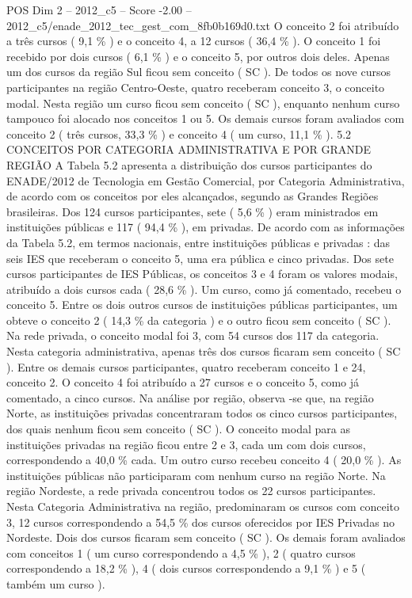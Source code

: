\begin{textsample}{POS Dim 2 – 2012\_c5 – Score -2.00 – 2012\_c5/enade\_2012\_tec\_gest\_com\_8fb0b169d0.txt}
O conceito 2 foi atribuído a três cursos ( 9,1 \% ) e o conceito 4, a 12 cursos ( 36,4 \% ).
O conceito 1 foi recebido por dois cursos ( 6,1 \% ) e o conceito 5, por outros dois deles.
Apenas um dos cursos da região Sul ficou sem conceito ( SC ).
De todos os nove cursos participantes na região Centro-Oeste, quatro receberam conceito 3, o conceito modal.
Nesta região um curso ficou sem conceito ( SC ), enquanto nenhum curso tampouco foi alocado nos conceitos 1 ou 5.
Os demais cursos foram avaliados com conceito 2 ( três cursos, 33,3 \% ) e conceito 4 ( um curso, 11,1 \% ). 5.2 CONCEITOS POR CATEGORIA ADMINISTRATIVA E POR GRANDE REGIÃO A Tabela 5.2 apresenta a distribuição dos cursos participantes do ENADE/2012 de Tecnologia em Gestão Comercial, por Categoria Administrativa, de acordo com os conceitos por eles alcançados, segundo as Grandes Regiões brasileiras.
Dos 124 cursos participantes, sete ( 5,6 \% ) eram ministrados em instituições públicas e 117 ( 94,4 \% ), em privadas.
De acordo com as informações da Tabela 5.2, em termos nacionais, entre instituições públicas e privadas : das seis IES que receberam o conceito 5, uma era pública e cinco privadas.
Dos sete cursos participantes de IES Públicas, os conceitos 3 e 4 foram os valores modais, atribuído a dois cursos cada ( 28,6 \% ).
Um curso, como já comentado, recebeu o conceito 5.
Entre os dois outros cursos de instituições públicas participantes, um obteve o conceito 2 ( 14,3 \% da categoria ) e o outro ficou sem conceito ( SC ).
Na rede privada, o conceito modal foi 3, com 54 cursos dos 117 da categoria.
Nesta categoria administrativa, apenas três dos cursos ficaram sem conceito ( SC ).
Entre os demais cursos participantes, quatro receberam conceito 1 e 24, conceito 2.
O conceito 4 foi atribuído a 27 cursos e o conceito 5, como já comentado, a cinco cursos.
Na análise por região, observa -se que, na região Norte, as instituições privadas concentraram todos os cinco cursos participantes, dos quais nenhum ficou sem conceito ( SC ).
O conceito modal para as instituições privadas na região ficou entre 2 e 3, cada um com dois cursos, correspondendo a 40,0 \% cada.
Um outro curso recebeu conceito 4 ( 20,0 \% ).
As instituições públicas não participaram com nenhum curso na região Norte.
Na região Nordeste, a rede privada concentrou todos os 22 cursos participantes.
Nesta Categoria Administrativa na região, predominaram os cursos com conceito 3, 12 cursos correspondendo a 54,5 \% dos cursos oferecidos por IES Privadas no Nordeste.
Dois dos cursos ficaram sem conceito ( SC ).
Os demais foram avaliados com conceitos 1 ( um curso correspondendo a 4,5 \% ), 2 ( quatro cursos correspondendo a 18,2 \% ), 4 ( dois cursos correspondendo a 9,1 \% ) e 5 ( também um curso ).

\end{textsample}

